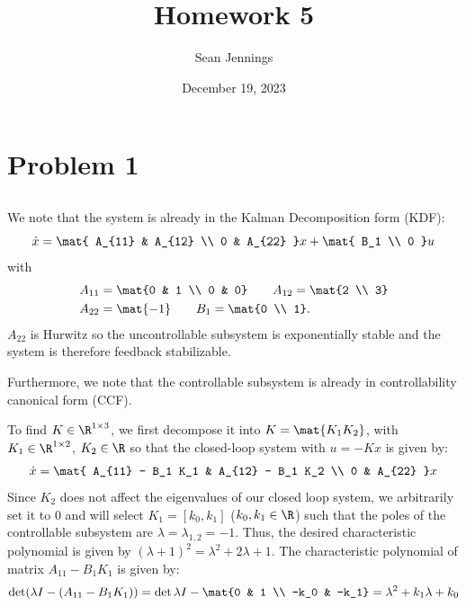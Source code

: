 \documentclass{homework}
\title{Homework 5}
\author{Sean Jennings}
\date{December 19, 2023}
\begin{document}
\maketitle

\section{Problem 1}
\subsection{}
We note that the system is already in the Kalman Decomposition form (KDF):
\begin{equation}
    \dot{x} = \mat{
        A_{11} & A_{12} \\
        0 & A_{22}
    } x + \mat{
        B_1 \\ 0
    } u
    \label{eq:kdf}
\end{equation}
with
\begin{align*}
    A_{11} &= \mat{0 & 1 \\ 0 & 0} \qquad A_{12} = \mat{2 \\ 3} \\
    A_{22} &= \mat{-1} \qquad B_1 = \mat{0 \\ 1}.
\end{align*}
$A_{22}$ is Hurwitz so the uncontrollable subsystem is exponentially stable
and the system is therefore feedback stabilizable.

Furthermore, we note that the controllable subsystem is already in controllability
canonical form (CCF).

To find $K\in\R^{1\times 3}$, we first decompose it into $K = \mat{K_1 K_2}$, with
$K_1 \in \R^{1 \times 2}$, $K_2\in\R$ so that the closed-loop system with $u=-Kx$
is given by:
\begin{equation*}
    \dot{x} = \mat{
        A_{11} - B_1 K_1 & A_{12} - B_1 K_2 \\
        0 & A_{22}
    } x
\end{equation*}
Since $K_2$ does not affect the eigenvalues of our closed loop system, we arbitrarily
set it to 0 and will select $K_1 = [k_0, k_1]$ ($k_0,k_1\in\R$) such that the poles of 
the controllable subsystem are $\lambda = \lambda_{1,2} = -1$. Thus, the desired characteristic polynomial
is given by $(\lambda + 1)^2 = \lambda^2 + 2\lambda + 1$. The characteristic polynomial
of matrix $A_{11} - B_1K_1$ is given by:
\begin{equation*}
    \det(\lambda I - (A_{11} - B_1K_1)) = \det{\lambda I - \mat{0 & 1 \\ -k_0 & -k_1}} = \lambda^2 + k_1 \lambda + k_0
\end{equation*}
\end{document}
